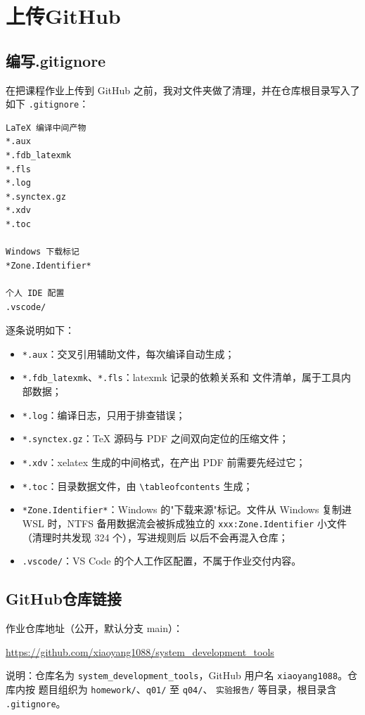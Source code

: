 \documentclass[a4paper,12pt]{report}
\begin{document}
\color{red}\chapter{上传GitHub}
\color{black}
\section{编写.gitignore}
在把课程作业上传到 GitHub 之前，我对文件夹做了清理，并在仓库根目录写入了
如下 \texttt{.gitignore}：

\begin{lstlisting}
LaTeX 编译中间产物
*.aux
*.fdb_latexmk
*.fls
*.log
*.synctex.gz
*.xdv
*.toc

Windows 下载标记
*Zone.Identifier*

个人 IDE 配置
.vscode/
\end{lstlisting}

逐条说明如下：

\begin{itemize}
    \item \texttt{*.aux}：交叉引用辅助文件，每次编译自动生成；
    \item \texttt{*.fdb\_latexmk}、\texttt{*.fls}：latexmk 记录的依赖关系和
    文件清单，属于工具内部数据；
    \item \texttt{*.log}：编译日志，只用于排查错误；
    \item \texttt{*.synctex.gz}：TeX 源码与 PDF 之间双向定位的压缩文件；
    \item \texttt{*.xdv}：xelatex 生成的中间格式，在产出 PDF 前需要先经过它；
    \item \texttt{*.toc}：目录数据文件，由 \texttt{\textbackslash tableofcontents}
    生成；
    \item \texttt{*Zone.Identifier*}：Windows 的"下载来源"标记。文件从 Windows
    复制进 WSL 时，NTFS 备用数据流会被拆成独立的
    \texttt{xxx:Zone.Identifier} 小文件（清理时共发现 324 个），写进规则后
    以后不会再混入仓库；
    \item \texttt{.vscode/}：VS Code 的个人工作区配置，不属于作业交付内容。
\end{itemize}

\section{GitHub仓库链接}
作业仓库地址（公开，默认分支 main）：

\begin{center}
{\url{https://github.com/xiaoyang1088/system_development_tools}}
\end{center}
说明：仓库名为 \texttt{system\_development\_tools}，GitHub 用户名 \texttt{xiaoyang1088}。仓库内按
题目组织为 \texttt{homework/}、\texttt{q01/} 至 \texttt{q04/}、
\texttt{实验报告/} 等目录，根目录含 \texttt{.gitignore}。
\end{document}
